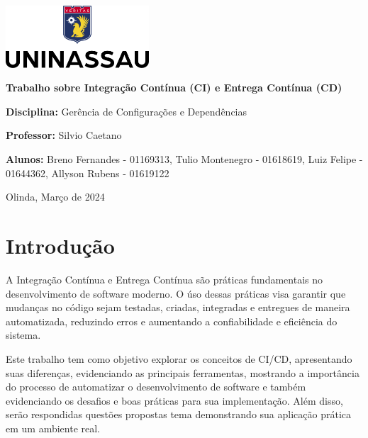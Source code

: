 \documentclass[a4paper,12pt]{article}
\begin{document}
\begin{titlepage}
    \centering
    \includegraphics[width=0.4\textwidth]{./media/uninassau-logo.png}\par\vspace{1cm}
    
    {\huge\bfseries Trabalho sobre Integração Contínua (CI) e Entrega Contínua (CD)\par}\vspace{1cm}
    
    \textbf{Disciplina:} Gerência de Configurações e Dependências\par
    \textbf{Professor:} Silvio Caetano\par
    \textbf{Alunos:} Breno Fernandes - 01169313, Tulio Montenegro - 01618619, Luiz Felipe - 01644362, Allyson Rubens - 01619122\par
    
    \vfill
    
    {\large Olinda, Março de 2024\par}
\end{titlepage}

\pagestyle{fancy}
\fancyhf{}
\fancyfoot[R]{\thepage}

\newpage

\section*{Introdução}
A Integração Contínua e Entrega Contínua são práticas fundamentais no desenvolvimento de software moderno. O úso dessas práticas visa garantir que mudanças no código sejam testadas, criadas, integradas e entregues de maneira automatizada, reduzindo erros e aumentando a confiabilidade e eficiência do sistema.  

Este trabalho tem como objetivo explorar os conceitos de CI/CD, apresentando suas diferenças, evidenciando as principais ferramentas, mostrando a importância do processo de automatizar o desenvolvimento de software e também evidenciando os desafios e boas práticas para sua implementação. Além disso, serão respondidas questões propostas tema demonstrando sua aplicação prática em um ambiente real.
\newpage{}
\end{document}
